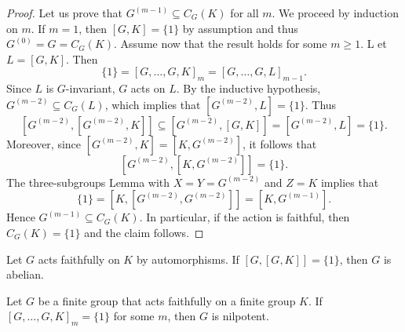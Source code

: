 \begin{proof}
	Let us prove that $G^{(m-1)}\subseteq  C_G(K)$ for all $m$. We proceed by induction on $m$. If $m=1$, then 
	$[G,K]=\{1\}$ by assumption and thus 
	$G^{(0)}=G=C_G(K)$. Assume now that the result holds for some $m\geq1$. L
	et $L=[G,K]$. Then
	\[
	\{1\}=[G,\dots,G,K]_m=[G,\dots,G,L]_{m-1}.
	\]
	Since $L$ is $G$-invariant, $G$ acts on $L$. 
	By the inductive hypothesis, $G^{(m-2)}\subseteq C_G(L)$, which 
	implies that $[G^{(m-2)},L]=\{1\}$. Thus 
	\[
	[G^{(m-2)},[G^{(m-2)},K]]\subseteq [G^{(m-2)},[G,K]]=[G^{(m-2)},L]=\{1\}.
	\]
	Moreover, since $[G^{(m-2)},K]=[K,G^{(m-2)}]$, 
	it follows that 
	\[
	[G^{(m-2)},[K,G^{(m-2)}]]=\{1\}.
	\]
	The three-subgroups Lemma
	with $X=Y=G^{(m-2)}$ and $Z=K$ implies that 
	\[
	\{1\}=[K,[G^{(m-2)},G^{(m-2)}]]=[K,G^{(m-1)}].
	\]  
	Hence $G^{(m-1)}\subseteq C_G(K)$. In particular, if the action is faithful, 
	then $C_G(K)=\{1\}$ and the claim follows. 
\end{proof}

\begin{exercise}
Let $G$ acts faithfully on $K$ by automorphisms. If $[G,[G,K]]=\{1\}$, then $G$ is abelian. 	
\end{exercise}

\begin{theorem}[Hall]
	Let $G$ be a finite group that acts faithfully on a finite group $K$. 
	If $[G,\dots,G,K]_m=\{1\}$ for some $m$, then $G$ is nilpotent. 
\end{theorem}


